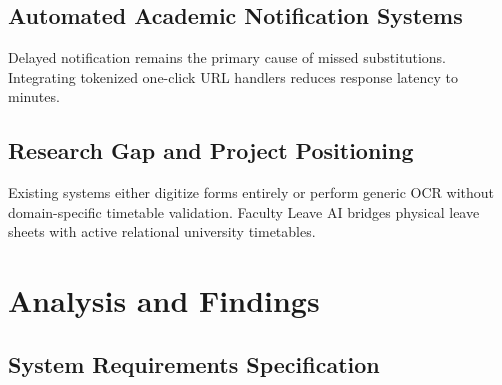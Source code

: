 \documentclass[12pt,letterpaper]{report}
\begin{document}
\section{Automated Academic Notification Systems}
Delayed notification remains the primary cause of missed substitutions. Integrating tokenized one-click URL handlers reduces response latency to minutes.

\section{Research Gap and Project Positioning}
Existing systems either digitize forms entirely or perform generic OCR without domain-specific timetable validation. Faculty Leave AI bridges physical leave sheets with active relational university timetables.

\chapter{Analysis and Findings}

\section{System Requirements Specification}
\end{document}
